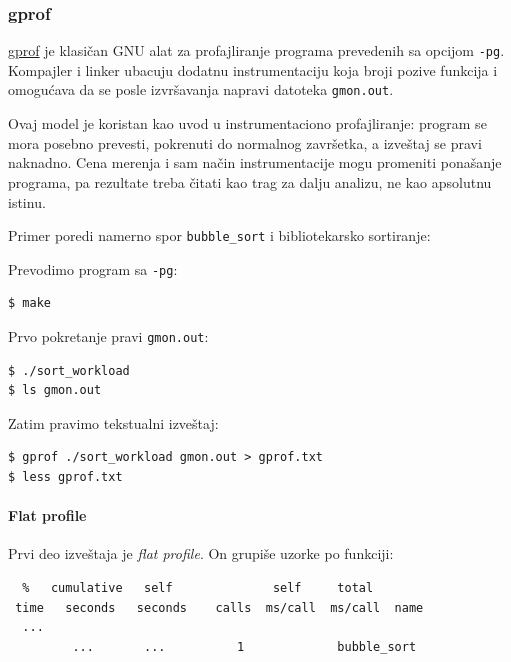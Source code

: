 \subsubsection{gprof}\label{gprof}

\href{https://sourceware.org/binutils/docs/gprof/}{gprof} je klasičan GNU alat za profajliranje programa prevedenih sa opcijom \texttt{-pg}. Kompajler i linker ubacuju dodatnu instrumentaciju koja broji pozive funkcija i omogućava da se posle izvršavanja napravi datoteka \texttt{gmon.out}.

Ovaj model je koristan kao uvod u instrumentaciono profajliranje: program se mora posebno prevesti, pokrenuti do normalnog završetka, a izveštaj se pravi naknadno. Cena merenja i sam način instrumentacije mogu promeniti ponašanje programa, pa rezultate treba čitati kao trag za dalju analizu, ne kao apsolutnu istinu.

Primer poredi namerno spor \texttt{bubble\_sort} i bibliotekarsko sortiranje:


Prevodimo program sa \texttt{-pg}:

\begin{verbatim}
$ make
\end{verbatim}

Prvo pokretanje pravi \texttt{gmon.out}:

\begin{verbatim}
$ ./sort_workload
$ ls gmon.out
\end{verbatim}

Zatim pravimo tekstualni izveštaj:

\begin{verbatim}
$ gprof ./sort_workload gmon.out > gprof.txt
$ less gprof.txt
\end{verbatim}

\paragraph{Flat profile}\label{gprof-flat-profile}

Prvi deo izveštaja je \emph{flat profile}. On grupiše uzorke po funkciji:

\begin{verbatim}
  %   cumulative   self              self     total
 time   seconds   seconds    calls  ms/call  ms/call  name
  ...
         ...       ...          1             bubble_sort
\end{verbatim}

